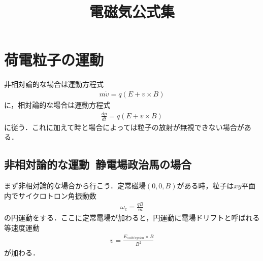 \documentclass[a4j]{jarticle}
\title{電磁気公式集}
\begin{document}
\section{荷電粒子の運動}
非相対論的な場合は運動方程式
\begin{align*}
 m\dot{v}=q(E+v\times B)
\end{align*}
に，相対論的な場合は運動方程式
\begin{align*}
\frac{dp}{dt}=q(E+v\times B)
\end{align*}
に従う．これに加えて時と場合によっては粒子の放射が無視できない場合がある．

\subsection{非相対論的な運動~静電場政治馬の場合~}
まず非相対論的な場合から行こう．定常磁場$(0,0,B)$がある時，粒子は$xy$平面内でサイクロトロン角振動数
\begin{align*}
 \omega_c=\frac{qB}{m}
\end{align*}
の円運動をする．ここに定常電場が加わると，円運動に電場ドリフトと呼ばれる等速度運動
\begin{align*}
 v=\frac{E_{suitixyoku}\times B}{B^2}
\end{align*}
が加わる．
\end{document}
